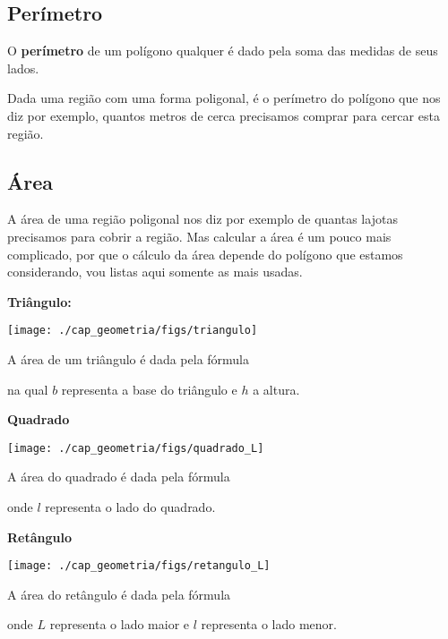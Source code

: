 \subsection{Perímetro}

\vskip0.3cm
 \colorbox{amarelo}{
 \begin{minipage}{0.9\linewidth}
 \begin{center}
  O \textbf{perímetro} de um polígono qualquer é dado pela soma das medidas de seus lados.
 \end{center}
 \end{minipage}}
 \vskip0.3cm


Dada uma região com uma forma poligonal, é o perímetro do polígono que nos diz por exemplo, quantos metros de cerca precisamos comprar para cercar esta região.

\subsection{Área}

A área de uma região poligonal nos diz por exemplo de quantas lajotas precisamos para cobrir a região. Mas calcular a área é um pouco mais complicado, por que o cálculo da área depende do polígono que estamos considerando, vou listas aqui somente as mais usadas.

\newpage

\textbf{Triângulo:}
\begin{multicols}{2}

\texttt{[image: ./cap\_geometria/figs/triangulo]}

A área de um triângulo é dada pela fórmula


na qual $b$ representa a base do triângulo e $h$ a altura.
\end{multicols}

\textbf{Quadrado}
\begin{multicols}{2}
\texttt{[image: ./cap\_geometria/figs/quadrado\_L]}

A área do quadrado é dada pela fórmula


onde $l$ representa o lado do quadrado.
\end{multicols}

\textbf{Retângulo}
\begin{multicols}{2}
\texttt{[image: ./cap\_geometria/figs/retangulo\_L]}

A área do retângulo é dada pela fórmula


onde $L$ representa o lado maior e $l$ representa o lado menor.
\end{multicols}

